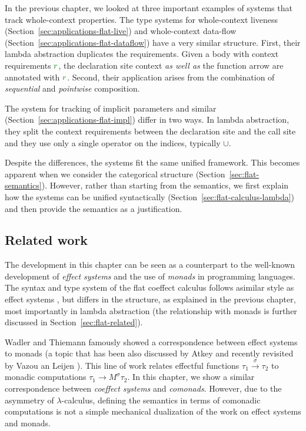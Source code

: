 In the previous chapter, we looked at three important examples of systems that track whole-context 
properties. The type systems for whole-context liveness (Section~\ref{sec:applications-flat-live}) 
and whole-context data-flow (Section~\ref{sec:applications-flat-dataflow}) have a very similar 
structure. First, their lambda abstraction duplicates the requirements. Given a body with context 
requirements $\cclrd{r}$, the declaration site context \emph{as well as} the function arrow are
annotated with $\cclrd{r}$. Second, their application arises from the combination of \emph{sequential} 
and \emph{pointwise} composition.

The system for tracking of implicit parameters and similar (Section~\ref{sec:applications-flat-impl})
differ in two ways. In lambda abstraction, they split the context requirements between the 
declaration site and the call site and they use only a single operator on the indices, typically $\cup$.

Despite the differences, the systems fit the same unified framework. This becomes apparent when
we consider the categorical structure (Section~\ref{sec:flat-semantics}). However, rather than 
starting from the semantics, we first explain how the systems can be unified syntactically
(Section~\ref{sec:flat-calculus-lambda}) and then provide the semantics as a justification.


\subsection{Related work}

The development in this chapter can be seen as a counterpart to the well-known development of 
\emph{effect systems} \cite{effects-gifford} and the use of \emph{monads} \cite{monad-notions}
in programming languages. The syntax and type system of the flat coeffect calculus follows 
asimilar style as effect systems \cite{effects-polymorphic,effects-talpin-et-al}, but differs
in the structure, as explained in the previous chapter, most importantly in lambda abstraction
(the relationship with monads is further discussed in Section~\ref{sec:flat-related}).

Wadler and Thiemann \cite{monads-effects-marriage} famously showed a correspondence between effect 
systems to monads (a topic that has been also discussed by Atkey \cite{monads-parameterised-notions}
and recently revisited by Vazou an Leijen \cite{monads-effects-remarriage}). This line of work
relates effectful functions $\tau_1 \xrightarrow{\sigma} \tau_2$ to monadic computations 
$\tau_1 \rightarrow M^\sigma \tau_2$. In this chapter, we show a similar correspondence between 
\emph{coeffect systems} and \emph{comonads}. However, due to the asymmetry of $\lambda$-calculus, 
defining the semantics in terms of comonadic computations is not a simple mechanical dualization
of the work on effect systems and monads.

